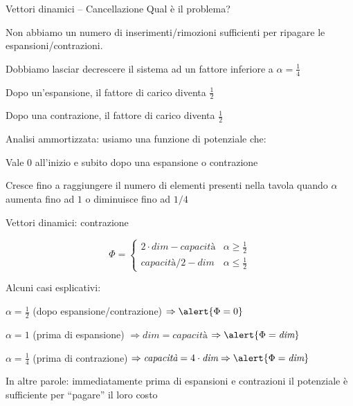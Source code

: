 \begin{frame}{Vettori dinamici -- Cancellazione}
Qual è il problema?
\BI
\item Non abbiamo un numero di inserimenti/rimozioni sufficienti per ripagare le espansioni/contrazioni.
\EI

\bigskip
Dobbiamo lasciar decrescere il sistema ad un fattore inferiore a $\alpha = \frac{1}{4}$
\BI
\item Dopo un'espansione, il fattore di carico diventa $\frac{1}{2}$
\item Dopo una contrazione, il fattore di carico diventa $\frac{1}{2}$
\EI

\bigskip
Analisi ammortizzata: usiamo una funzione di potenziale che:
\BI
\item Vale $0$ all’inizio e subito dopo una espansione o contrazione
\item Cresce fino a raggiungere il numero di elementi presenti nella tavola quando $\alpha$ aumenta fino ad $1$ o diminuisce fino ad $1/4$
\EI
\end{frame}

\begin{frame}{Vettori dinamici: contrazione}

\begin{myboxtitle}
\[
\Phi = \begin{cases}	
2 \cdot \textit{dim} - \textit{capacità} & \alpha \geq \frac{1}{2}\\
\textit{capacità} / 2 - \textit{dim}  & \alpha \leq \frac{1}{2}
\end{cases}
\]
\end{myboxtitle}

\bigskip
Alcuni casi esplicativi:
\BI
\item $\alpha = \frac{1}{2}$ (dopo espansione/contrazione) $\Rightarrow \alert{\Phi = 0}$
\item $\alpha = 1$ (prima di espansione) $\Rightarrow \textit{dim}=\textit{capacità}$ $\Rightarrow \alert{\Phi = \textit{dim}}$
\item $\alpha = \frac{1}{4}$ (prima di contrazione) $\Rightarrow \textit{capacità} = 4 \cdot \textit{dim} \Rightarrow \alert{\Phi = \textit{dim}}$
\EI

\bigskip
In altre parole: immediatamente prima di espansioni e contrazioni il potenziale è sufficiente per “pagare” il loro costo

\end{frame}

